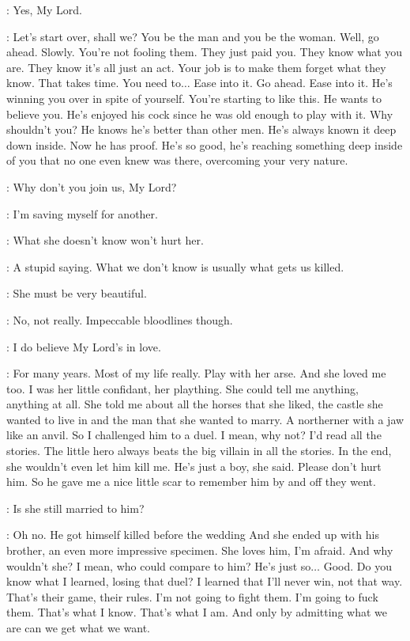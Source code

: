 \ROS: Yes, My Lord. 

\LITTLEFINGER: Let's start over, shall we? You be the man and you be the woman. Well, go ahead. Slowly. You're not fooling them. They just paid you. They know what you are. They know it's all just an act. Your job is to make them forget what they know. That takes time. You need to$\ldots$ Ease into it. Go ahead. Ease into it. He's winning you over in spite of yourself. You're starting to like this.  He wants to believe you. He's enjoyed his cock since he was old enough to play with it. Why shouldn't you? He knows he's better than other men. He's always known it deep down inside. Now he has proof. He's so good, he's reaching something deep inside of you that no one even knew was there, overcoming your very nature. 

\ROS: Why don't you join us, My Lord? 

\LITTLEFINGER: I'm saving myself for another. 

\ROS: What she doesn't know won't hurt her. 

\LITTLEFINGER: A stupid saying. What we don't know is usually what gets us killed. 

\ROS: She must be very beautiful. 

\LITTLEFINGER: No, not really. Impeccable bloodlines though. 

\ROS: I do believe My Lord's in love. 

\LITTLEFINGER: For many years. Most of my life really. Play with her arse. And she loved me too. I was her little confidant, her plaything. She could tell me anything, anything at all. She told me about all the horses that she liked, the castle she wanted to live in and the man that she wanted to marry.  A northerner with a jaw like an anvil.  So I challenged him to a duel.  I mean, why not? I'd read all the stories. The little hero always beats the big villain in all the stories. In the end, she wouldn't even let him kill me. He's just a boy, she said. Please don't hurt him. So he gave me a nice little scar to remember him by and off they went. 

\ROS: Is she still married to him? 

\LITTLEFINGER: Oh no. He got himself killed before the wedding And she ended up with his brother, an even more impressive specimen. She loves him, I'm afraid. And why wouldn't she? I mean, who could compare to him? He's just so$\ldots$ Good. Do you know what I learned, losing that duel? I learned that I'll never win, not that way. That's their game, their rules. I'm not going to fight them. I'm going to fuck them. That's what I know. That's what I am. And only by admitting what we are can we get what we want. 

